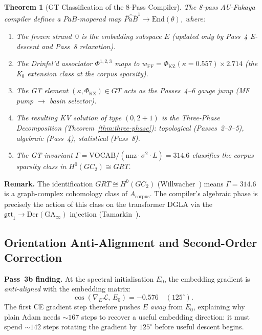 \documentclass[11pt]{amsart}
\newtheorem{theorem}{Theorem}[section]
\begin{document}
\begin{theorem}[GT Classification of the 8-Pass Compiler]
\label{thm:gt_compiler}
The 8-pass AU-Fukaya compiler defines a $PaB$-moperad map
$\widehat{PaB}^1 \to \mathrm{End}(\theta)$, where:
\begin{enumerate}
\item The frozen strand~$0$ is the embedding subspace $E$
      (updated only by Pass~4 E-descent and Pass~8 relaxation).
\item The Drinfel'd associator $\Phi^{1,2,3}$ maps to
      $w_\mathrm{FF} = \Phi_\mathrm{KZ}(\kappa=0.557) \times 2.714$
      (the K$_0$ extension class at the corpus sparsity).
\item The GT element $(\kappa, \Phi_\mathrm{KZ})\in GT$ acts as the
      Passes~4--6 gauge jump (MF pump $\to$ basin selector).
\item The resulting KV solution of type $(0,2{+}1)$ is the
      Three-Phase Decomposition (Theorem~\ref{thm:three-phase}):
      topological (Passes~2--3--5), algebraic (Pass~4), statistical (Pass~8).
\item The GT invariant
      $\Gamma = \mathrm{VOCAB}/(\mathrm{nnz}\cdot\sigma^2\cdot L) = 314.6$
      classifies the corpus sparsity class in $H^0(GC_2)\cong GRT$.
\end{enumerate}
\end{theorem}

\textbf{Remark.}
The identification $GRT\cong H^0(GC_2)$ (Willwacher~\cite{willwacher2015})
means $\Gamma=314.6$ is a graph-complex cohomology class of $A_\mathrm{corpus}$.
The compiler's algebraic phase is precisely the action of this class on
the transformer DGLA via the $\mathfrak{grt}_1\to\mathrm{Der}(\mathrm{GA}_\infty)$
injection (Tamarkin~\cite{tamarkin0202039}).



\subsection{Orientation Anti-Alignment and Second-Order Correction}
\label{subsec:orientation}

\textbf{Pass~3b finding.}
At the spectral initialisation $E_0$, the embedding gradient is \emph{anti-aligned}
with the embedding matrix:
\[
  \cos(\nabla_E \mathcal{L},\, E_0) = -0.576 \quad (125^\circ).
\]
The first CE gradient step therefore pushes $E$ \emph{away} from $E_0$,
explaining why plain Adam needs $\sim\!167$ steps to recover a useful embedding
direction: it must spend $\sim\!142$ steps rotating the gradient by $125^\circ$
before useful descent begins.
\end{document}
